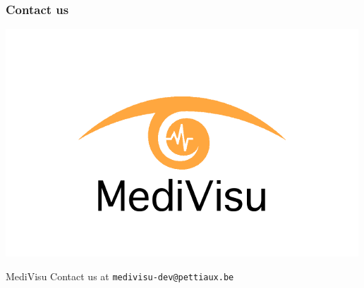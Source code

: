 \documentclass[11pt]{beamer}
\begin{document}
\begin{frame}
\frametitle{Contact us}
\begin{center}
\includegraphics[scale=0.7]{medivisu.png}
\end{center}
\begin{thebibliography}{10}
\beamertemplatearticlebibitems
{}
MediVisu
\newblock Contact us at {\tt medivisu-dev@pettiaux.be}
\end{thebibliography}
\end{frame}
\end{document}
